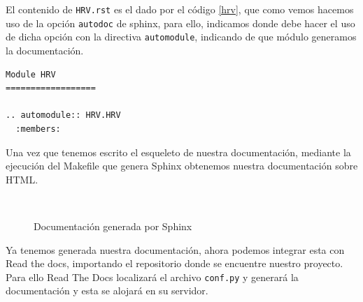 El contenido de \texttt{HRV.rst} es el dado por el código \ref{hrv}, que como vemos hacemos uso de la opción \texttt{autodoc} de sphinx, para ello, indicamos donde debe hacer el uso de dicha opción con la directiva \texttt{automodule}, indicando de que módulo generamos la documentación. \begin{lstlisting}[caption=\texttt{HRV.rst},label=hrv]
Module HRV
==================

.. automodule:: HRV.HRV
  :members:

\end{lstlisting}
Una vez que tenemos escrito el esqueleto de nuestra documentación, mediante la ejecución del Makefile que genera Sphinx obtenemos nuestra documentación sobre HTML.
\begin{figure}[H]
    \centering
    \\
    \caption{Documentación generada por Sphinx}
    \label{fig:sphinx}
\end{figure}

Ya tenemos generada nuestra documentación, ahora podemos integrar esta con Read the docs, importando el repositorio donde se encuentre nuestro proyecto. Para ello Read The Docs localizará el archivo \texttt{conf.py} y generará la documentación y esta se alojará en su servidor. 

